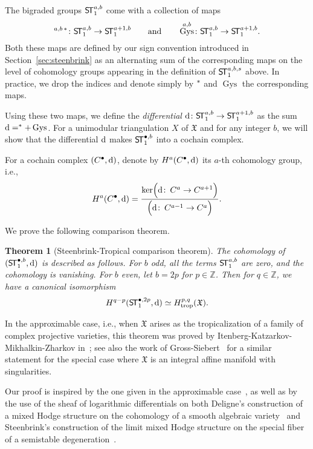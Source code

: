 \documentclass[11pt]{amsart}
\newtheorem{thm}{Theorem}[section]
\theoremstyle{definition}
\numberwithin{equation}{section}
\renewcommand{\~}{\widetilde}
\newcommand{\bul}{\bullet} %
\let\Im\relax
\DeclareMathOperator{\Im}{Im} %
\DeclareMathOperator{\gys}{Gys} %
\newcommand{\trop}{\mathrm{trop}} %
\let\i\relax
\newcommand{\i}{{\mathop{}\mathrm{i}}} %
\renewcommand{\d}{{\rm d}} %
\newcommand{\X}{\mathfrak X}
\newcommand{\ST}{\textnormal{\textsf{S\!T}}} %
\begin{document}
\medskip

The bigraded groups $\ST_1^{a,b}$ come with a collection of maps
\[\i^{a,b\,*} \colon \ST^{a,b}_1 \to \ST_1^{a+1, b} \qquad \textrm{and} \qquad \gys^{a,b}\colon \ST^{a,b}_1 \to \ST_1^{a+1, b}.\]
Both these maps are defined by our sign convention introduced in Section~\ref{sec:steenbrink} as an alternating sum of the corresponding maps on the level of cohomology groups appearing in the definition of $\ST_1^{a,b,s}$ above. In practice, we drop the indices and denote simply by $\i^*$ and $\gys$ the corresponding maps.

\medskip

Using these two maps, we define the \emph{differential} $\d\colon \ST_1^{a,b} \to \ST_1^{a+1,b}$ as the sum $\d = \i^*+ \gys$. For a unimodular triangulation $X$ of $\X$ and for any integer $b$, we will show that the differential $\d$ makes $\ST_1^{\bul,b}$ into a cochain complex.

\smallskip
For a cochain complex $(C^\bul, \d)$, denote by $H^a(C^\bul, \d)$ its $a$-th cohomology group, i.e.,
\[H^a(C^\bul, \d) = \frac{\ker\Bigl(\d\colon \, C^{a} \rightarrow C^{a+1}\Bigr)}{\Im\Bigl(\d\colon \, C^{a-1} \rightarrow C^{a}\Bigr)}. \]

We prove the following comparison theorem.
\begin{thm}[Steenbrink-Tropical comparison theorem] \label{thm:steenbrink-intro}
The cohomology of $(\ST_1^{\bul,b},\d)$ is described as follows. For $b$ odd, all the terms $\ST_1^{a,b}$ are zero, and the cohomology is vanishing. For $b$ even, let $b=2p$ for $p \in \mathbb Z$. Then for $q\in \mathbb Z$, we have a canonical isomorphism
\[H^{q-p}(\ST^{\bul,2p}_1, \d) \simeq H^{p,q}_{\trop}(\X).\]
\end{thm}

\medskip

In the approximable case, i.e., when $\X$ arises as the tropicalization of a family of complex projective varieties, this theorem was proved by Itenberg-Katzarkov-Mikhalkin-Zharkov in~\cite{IKMZ}; see also the work of Gross-Siebert~\cites{GS10, GS06} for a similar statement for the special case where $\X$ is an integral affine manifold with singularities.

\medskip

Our proof is inspired by the one given in the approximable case~\cites{IKMZ}, as well as by the use of the sheaf of logarithmic differentials on both Deligne's construction of a mixed Hodge structure on the cohomology of a smooth algebraic variety~\cite{Deligne-Hodge2} and Steenbrink's construction of the limit mixed Hodge structure on the special fiber of a semistable degeneration~\cite{Ste76}.
\end{document}
